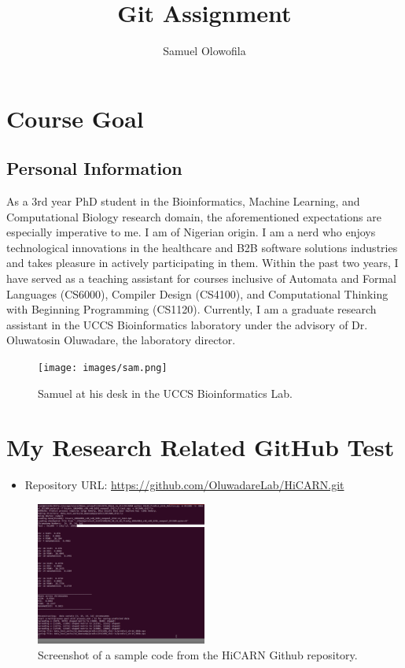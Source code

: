 \documentclass{article}
\title{Git Assignment}
\author{Samuel Olowofila}
\date{}
\begin{document}
\maketitle

\section{Course Goal}
\subsection{Personal Information}
As a 3rd year PhD student in the Bioinformatics, Machine Learning, and Computational Biology research domain, the aforementioned expectations are especially imperative to me. 
I am of Nigerian origin. I am a nerd who enjoys technological innovations in the healthcare and B2B software solutions industries and takes pleasure in actively participating in them. Within the past two years, I have served as a teaching assistant for courses inclusive of Automata and Formal Languages (CS6000), Compiler Design (CS4100), and Computational Thinking with Beginning Programming (CS1120). Currently, I am a graduate research assistant in the UCCS Bioinformatics laboratory under the advisory of Dr. Oluwatosin Oluwadare, the laboratory director.

\begin{figure}[ht!]
    \centering
    \texttt{[image: images/sam.png]}
    \caption{Samuel at his desk in the UCCS Bioinformatics Lab.}
    \label{Samuel}
\end{figure}

\section{My Research Related GitHub Test}
\begin{itemize}
    \item Repository URL: \url{https://github.com/OluwadareLab/HiCARN.git}
\end{itemize}
\begin{figure}[ht!]
    \centering
    \includegraphics[width=0.5\textwidth]{images/hicarn_screenshot.png}
    \caption{Screenshot of a sample code from the HiCARN Github repository.}
    \label{Samuel}
\end{figure}
\end{document}
